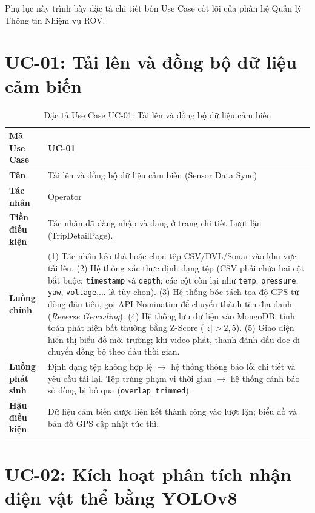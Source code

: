 \documentclass[../DoAn.tex]{subfiles}
\begin{document}
Phụ lục này trình bày đặc tả chi tiết bốn Use Case cốt lõi của phân hệ Quản lý Thông tin Nhiệm vụ ROV.

\section{UC-01: Tải lên và đồng bộ dữ liệu cảm biến}

\begin{longtable}{|p{3.5cm}|p{10.0cm}|}
\caption{Đặc tả Use Case UC-01: Tải lên và đồng bộ dữ liệu cảm biến}\label{tab:b-uc01}\\
\hline
\textbf{Mã Use Case} & UC-01 \\
\hline
\textbf{Tên} & Tải lên và đồng bộ dữ liệu cảm biến (Sensor Data Sync) \\
\hline
\textbf{Tác nhân} & Operator \\
\hline
\textbf{Tiền điều kiện} & Tác nhân đã đăng nhập và đang ở trang chi tiết Lượt lặn (TripDetailPage). \\
\hline
\textbf{Luồng chính} &
(1) Tác nhân kéo thả hoặc chọn tệp CSV/DVL/Sonar vào khu vực tải lên. \newline
(2) Hệ thống xác thực định dạng tệp (CSV phải chứa hai cột bắt buộc: \texttt{timestamp} và \texttt{depth}; các cột còn lại như \texttt{temp}, \texttt{pressure}, \texttt{yaw}, \texttt{voltage},... là tùy chọn). \newline
(3) Hệ thống bóc tách tọa độ GPS từ dòng đầu tiên, gọi API Nominatim để chuyển thành tên địa danh (\textit{Reverse Geocoding}). \newline
(4) Hệ thống lưu dữ liệu vào MongoDB, tính toán phát hiện bất thường bằng Z-Score ($|z| > 2{,}5$). \newline
(5) Giao diện hiển thị biểu đồ môi trường; khi video phát, thanh đánh dấu dọc di chuyển đồng bộ theo dấu thời gian. \\
\hline
\textbf{Luồng phát sinh} & Định dạng tệp không hợp lệ $\to$ hệ thống thông báo lỗi chi tiết và yêu cầu tải lại. Tệp trùng phạm vi thời gian $\to$ hệ thống cảnh báo số dòng bị bỏ qua (\texttt{overlap\_trimmed}). \\
\hline
\textbf{Hậu điều kiện} & Dữ liệu cảm biến được liên kết thành công vào lượt lặn; biểu đồ và bản đồ GPS cập nhật tức thì. \\
\hline
\end{longtable}

\section{UC-02: Kích hoạt phân tích nhận diện vật thể bằng YOLOv8}
\end{document}
